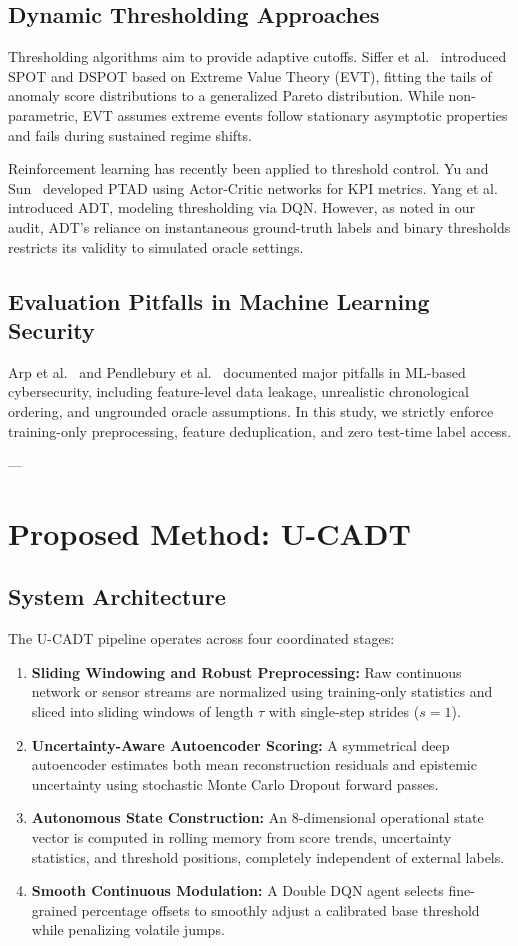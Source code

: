 \documentclass[conference]{IEEEtran}
\begin{document}
\subsection{Dynamic Thresholding Approaches}
Thresholding algorithms aim to provide adaptive cutoffs. Siffer et al.~\cite{siffer2017anomaly} introduced SPOT and DSPOT based on Extreme Value Theory (EVT), fitting the tails of anomaly score distributions to a generalized Pareto distribution. While non-parametric, EVT assumes extreme events follow stationary asymptotic properties and fails during sustained regime shifts.

Reinforcement learning has recently been applied to threshold control. Yu and Sun~\cite{yu2020policy} developed PTAD using Actor-Critic networks for KPI metrics. Yang et al.~\cite{yang2023adt} introduced ADT, modeling thresholding via DQN. However, as noted in our audit, ADT's reliance on instantaneous ground-truth labels and binary thresholds restricts its validity to simulated oracle settings.

\subsection{Evaluation Pitfalls in Machine Learning Security}
Arp et al.~\cite{arp2022dos} and Pendlebury et al.~\cite{tesseract2019} documented major pitfalls in ML-based cybersecurity, including feature-level data leakage, unrealistic chronological ordering, and ungrounded oracle assumptions. In this study, we strictly enforce training-only preprocessing, feature deduplication, and zero test-time label access.

---

\section{Proposed Method: U-CADT}

\subsection{System Architecture}
The U-CADT pipeline operates across four coordinated stages:
\begin{enumerate}
    \item \textbf{Sliding Windowing and Robust Preprocessing:} Raw continuous network or sensor streams are normalized using training-only statistics and sliced into sliding windows of length $\tau$ with single-step strides ($s=1$).
    \item \textbf{Uncertainty-Aware Autoencoder Scoring:} A symmetrical deep autoencoder estimates both mean reconstruction residuals and epistemic uncertainty using stochastic Monte Carlo Dropout forward passes.
    \item \textbf{Autonomous State Construction:} An 8-dimensional operational state vector is computed in rolling memory from score trends, uncertainty statistics, and threshold positions, completely independent of external labels.
    \item \textbf{Smooth Continuous Modulation:} A Double DQN agent selects fine-grained percentage offsets to smoothly adjust a calibrated base threshold while penalizing volatile jumps.
\end{enumerate}
\end{document}
